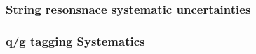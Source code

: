 \subsubsection{String resonsnace systematic uncertainties}

\subsubsection{q/g tagging Systematics}

